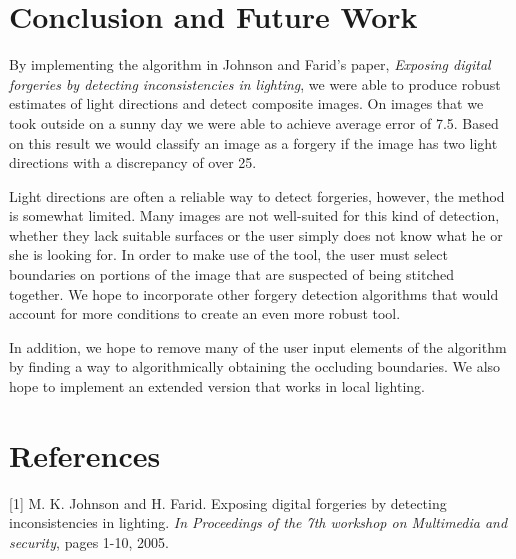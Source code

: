 \documentclass[10pt,twocolumn,letterpaper]{article}
\begin{document}
\section{Conclusion and Future Work}
By implementing the algorithm in Johnson and Farid's paper, \emph{Exposing digital forgeries by detecting inconsistencies in lighting}, we were able to produce robust estimates of light directions and detect composite images. On images that we took outside on a sunny day we were able to achieve average error of 7.5\textdegree. Based on this result we would classify an image as a forgery if the image has two light directions with a discrepancy of over 25\textdegree. 
 
Light directions are often a reliable way to detect forgeries, however, the method is somewhat limited. Many images are not well-suited for this kind of detection, whether they lack suitable surfaces or the user simply does not know what he or she is looking for. In order to make use of the tool, the user must select boundaries on portions of the image that are suspected of being stitched together. We hope to incorporate other forgery detection algorithms that would account for more conditions to create an even more robust tool.

In addition, we hope to remove many of the user input elements of the algorithm by finding a way to algorithmically obtaining the occluding boundaries. We also hope to implement an extended version that works in local lighting.
\section{References}

[1] M. K. Johnson and H. Farid. Exposing digital forgeries by detecting inconsistencies in lighting. \emph{In Proceedings of the 7th workshop on Multimedia and security}, pages 1-10, 2005.
\end{document}
